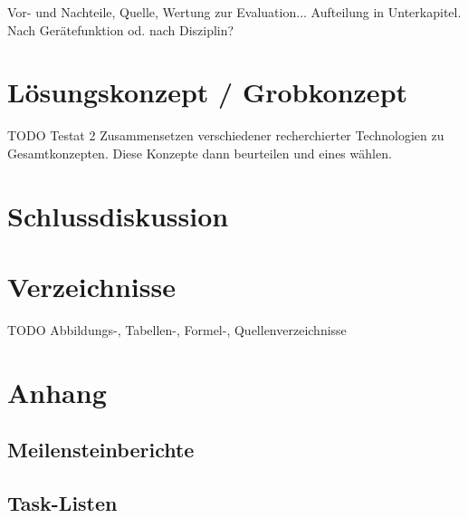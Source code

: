 \documentclass[a4paper]{report}
\begin{document}
Vor- und Nachteile, Quelle, Wertung zur Evaluation... 
Aufteilung in Unterkapitel. Nach Gerätefunktion od. nach Disziplin? 

\chapter{Lösungskonzept / Grobkonzept}
TODO Testat 2
Zusammensetzen verschiedener recherchierter Technologien zu Gesamtkonzepten. Diese Konzepte dann beurteilen und eines wählen. 

\chapter{Schlussdiskussion}

\chapter{Verzeichnisse}
TODO Abbildungs-, Tabellen-, Formel-, Quellenverzeichnisse
\printbibliography

\chapter{Anhang}
\section{Meilensteinberichte}

\section{Task-Listen}
\end{document}
